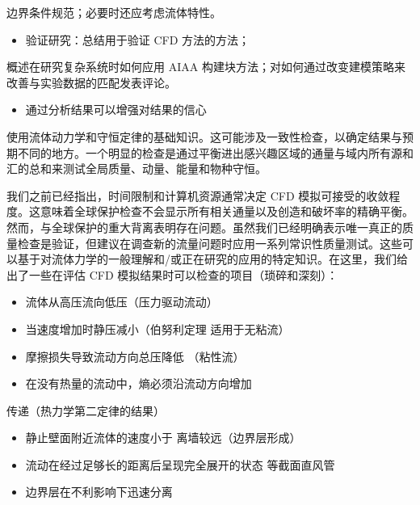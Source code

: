 \documentclass[11pt,a4paper,openany,fontset=none]{ctexbook}
\begin{document}
边界条件规范；必要时还应考虑流体特性。

\begin{itemize}

\item 验证研究：总结用于验证 CFD 方法的方法；

\end{itemize}

概述在研究复杂系统时如何应用 AIAA 构建块方法；对如何通过改变建模策略来改善与实验数据的匹配发表评论。

\begin{itemize}

\item 通过分析结果可以增强对结果的信心

\end{itemize}

使用流体动力学和守恒定律的基础知识。这可能涉及一致性检查，以确定结果与预期不同的地方。一个明显的检查是通过平衡进出感兴趣区域的通量与域内所有源和汇的总和来测试全局质量、动量、能量和物种守恒。

我们之前已经指出，时间限制和计算机资源通常决定 CFD 模拟可接受的收敛程度。这意味着全球保护检查不会显示所有相关通量以及创造和破坏率的精确平衡。然而，与全球保护的重大背离表明存在问题。虽然我们已经明确表示唯一真正的质量检查是验证，但建议在调查新的流量问题时应用一系列常识性质量测试。这些可以基于对流体力学的一般理解和/或正在研究的应用的特定知识。在这里，我们给出了一些在评估 CFD 模拟结果时可以检查的项目（琐碎和深刻）：

\begin{itemize}

\item 流体从高压流向低压（压力驱动流动）

\item 当速度增加时静压减小（伯努利定理 适用于无粘流）

\item 摩擦损失导致流动方向总压降低 （粘性流）

\item 在没有热量的流动中，熵必须沿流动方向增加

\end{itemize}

传递（热力学第二定律的结果）

\begin{itemize}

\item 静止壁面附近流体的速度小于 离墙较远（边界层形成）

\item 流动在经过足够长的距离后呈现完全展开的状态 等截面直风管

\item 边界层在不利影响下迅速分离

\end{itemize}
\end{document}
